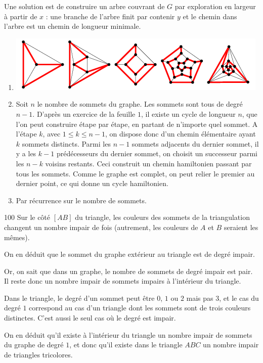 \begin{Soln}{97}
Une solution est de construire un arbre couvrant de $G$ par exploration en largeur à partir de $x$ : une branche de l'arbre finit par contenir $y$ et le chemin dans l'arbre est un chemin de longueur minimale.
\end{Soln}
\begin{Soln}{98}
\begin{enumerate}
\item\begin{center}
\includegraphics[scale=0.5]{img/PlatonicHamiltonian.png}
\end{center}
\item Soit $n$ le nombre de sommets du graphe. Les sommets sont tous de degré $n-1$. D'après un exercice de la feuille $1$, il existe un cycle de longueur $n$, que l'on peut construire étape par étape, en partant de n'importe quel sommet. A l'étape $k$, avec $1\leq k\leq n-1$, on dispose donc d'un chemin élémentaire ayant $k$ sommets distincts. Parmi les $n-1$ sommets adjacents du dernier sommet, il y a les $k-1$ prédécesseurs du dernier sommet, on choisit un successeur parmi les $n-k$ voisins restants. Ceci construit un chemin hamiltonien passant par tous les sommets. Comme le graphe est complet, on peut relier le premier au dernier point, ce qui donne un cycle hamiltonien.
\item Par récurrence sur le nombre de sommets.
\end{enumerate}
\end{Soln}
\begin{Soln}{100}
Sur le côté $[AB]$ du triangle, les couleurs des sommets de la triangulation changent un nombre impair de fois (autrement, les couleurs de $A$ et $B$ seraient les mêmes).

On en déduit que le sommet du graphe extérieur au triangle est de degré impair.

Or, on sait que dans un graphe, le nombre de sommets de degré impair est pair. Il reste donc un nombre impair de sommets impairs à l'intérieur du triangle.

Dans le triangle, le degré d'un sommet peut être $0$, $1$ ou $2$ mais pas $3$, et le cas du degré $1$ correspond au cas d'un triangle dont les sommets sont de trois couleurs distinctes. C'est aussi le seul cas où le degré est impair.

On en déduit qu'il existe à l'intérieur du triangle un nombre impair de sommets du graphe de degré $1$, et donc qu'il existe dans le triangle $ABC$ un nombre impair de triangles tricolores.
\end{Soln}
